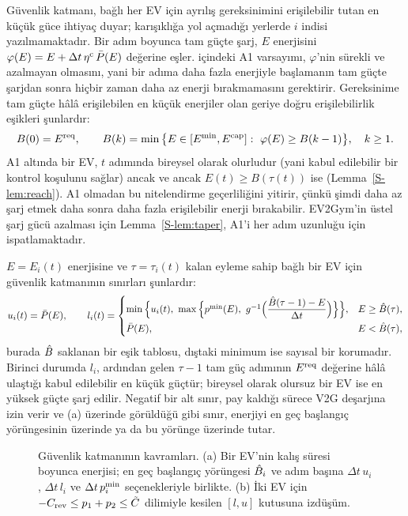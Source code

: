 Güvenlik katmanı, bağlı her EV için ayrılış gereksinimini erişilebilir tutan en küçük güce ihtiyaç duyar; karışıklığa yol açmadığı yerlerde $i$ indisi yazılmamaktadır.
Bir adım boyunca tam güçte şarj, $E$ enerjisini $\varphi(E)=E+\Delta t\,\eta^{\mathrm c}\,\bar P(E)$ değerine eşler.
 içindeki A1 varsayımı, $\varphi$'nin sürekli ve azalmayan olmasını, yani bir adıma daha fazla enerjiyle başlamanın tam güçte şarjdan sonra hiçbir zaman daha az enerji bırakmamasını gerektirir.
Gereksinime tam güçte hâlâ erişilebilen en küçük enerjiler olan geriye doğru erişilebilirlik eşikleri şunlardır:
\begin{equation}\label{eq:thresholds}
B(0)=\Ereq,\qquad B(k)=\min\big\{E\in[E^{\min},E^{\sm{cap}}]:\ \varphi(E)\ge B(k-1)\big\},\quad k\ge1 .
\end{equation}
A1 altında bir EV, $t$ adımında bireysel olarak olurludur (yani kabul edilebilir bir kontrol  koşulunu sağlar) ancak ve ancak $E(t)\ge B(\tau(t))$ ise (Lemma~\ref{S-lem:reach}).
A1 olmadan bu nitelendirme geçerliliğini yitirir, çünkü şimdi daha az şarj etmek daha sonra daha fazla erişilebilir enerji bırakabilir.
EV2Gym'in üstel şarj gücü azalması için Lemma~\ref{S-lem:taper}, A1'i her adım uzunluğu için ispatlamaktadır.

$E=E_i(t)$ enerjisine ve $\tau=\tau_i(t)$ kalan eyleme sahip bağlı bir EV için güvenlik katmanının sınırları şunlardır:
\begin{equation}\label{eq:bounds}
u_i(t)=\bar P(E),\qquad
l_i(t)=\begin{cases}
\min\Big\{u_i(t),\ \max\Big\{\pmn(E),\ g^{-1}\Big(\dfrac{\Bh(\tau-1)-E}{\Delta t}\Big)\Big\}\Big\}, & E\ge\Bh(\tau),\\[2mm]
\bar P(E), & E<\Bh(\tau),
\end{cases}
\end{equation}
burada $\hat B$ saklanan bir eşik tablosu, dıştaki minimum ise sayısal bir korumadır.
Birinci durumda $l_i$, ardından gelen $\tau-1$ tam güç adımının $E^{\mathrm{req}}$ değerine hâlâ ulaştığı kabul edilebilir en küçük güçtür; bireysel olarak olursuz bir EV ise en yüksek güçte şarj edilir.
Negatif bir alt sınır, pay kaldığı sürece V2G deşarjına izin verir ve (a) üzerinde görüldüğü gibi sınır, enerjiyi en geç başlangıç yörüngesinin üzerinde ya da bu yörünge üzerinde tutar.

\begin{figure}[t]
\centering
{}
\caption{Güvenlik katmanının kavramları. (a) Bir EV'nin kalış süresi boyunca enerjisi; en geç başlangıç yörüngesi $\hat B_i$ ve adım başına $\Delta t\,u_i$, $\Delta t\,l_i$ ve $\Delta t\,p^{\min}_i$ seçenekleriyle birlikte. (b) İki EV için $-C_{\mathrm{rev}}\le p_1+p_2\le\tilde C$ dilimiyle kesilen $[l,u]$ kutusuna izdüşüm.}
\label{fig:concepts}
\end{figure}

